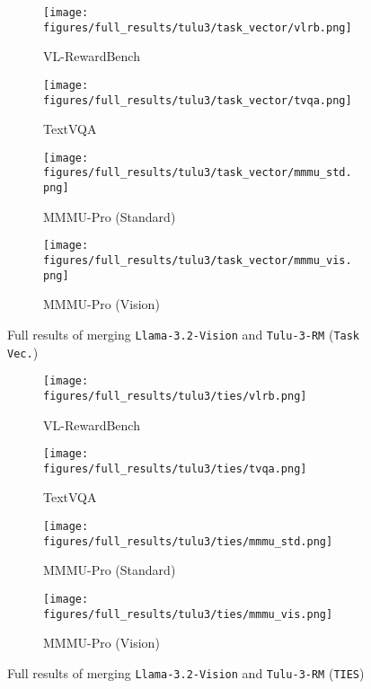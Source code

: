 \begin{figure*}[ht]
     \centering
     \begin{subfigure}[b]{0.245\linewidth}
         \centering
         \texttt{[image: figures/full\_results/tulu3/task\_vector/vlrb.png]}
         \caption{VL-RewardBench}
     \end{subfigure}
     \hfill
     \begin{subfigure}[b]{0.245\linewidth}
         \centering
         \texttt{[image: figures/full\_results/tulu3/task\_vector/tvqa.png]}
         \caption{TextVQA}
     \end{subfigure}
     \hfill
      \begin{subfigure}[b]{0.245\linewidth}
         \centering
         \texttt{[image: figures/full\_results/tulu3/task\_vector/mmmu\_std.png]}
         \caption{MMMU-Pro (Standard)}
     \end{subfigure}
     \hfill
     \begin{subfigure}[b]{0.245\linewidth}
         \centering
         \texttt{[image: figures/full\_results/tulu3/task\_vector/mmmu\_vis.png]}
         \caption{MMMU-Pro (Vision)}
     \end{subfigure}
        \caption{Full results of merging \texttt{Llama-3.2-Vision} and \texttt{Tulu-3-RM} (\texttt{Task Vec.})}
        \vspace{-10pt}
        \label{fig:full_tulu3_task_vector}
\end{figure*}

\begin{figure*}[ht]
     \centering
     \begin{subfigure}[b]{0.245\linewidth}
         \centering
         \texttt{[image: figures/full\_results/tulu3/ties/vlrb.png]}
         \caption{VL-RewardBench}
     \end{subfigure}
     \hfill
     \begin{subfigure}[b]{0.245\linewidth}
         \centering
         \texttt{[image: figures/full\_results/tulu3/ties/tvqa.png]}
         \caption{TextVQA}
     \end{subfigure}
     \hfill
      \begin{subfigure}[b]{0.245\linewidth}
         \centering
         \texttt{[image: figures/full\_results/tulu3/ties/mmmu\_std.png]}
         \caption{MMMU-Pro (Standard)}
     \end{subfigure}
     \hfill
     \begin{subfigure}[b]{0.245\linewidth}
         \centering
         \texttt{[image: figures/full\_results/tulu3/ties/mmmu\_vis.png]}
         \caption{MMMU-Pro (Vision)}
     \end{subfigure}
        \caption{Full results of merging \texttt{Llama-3.2-Vision} and \texttt{Tulu-3-RM} (\texttt{TIES})}
        \vspace{-10pt}
        \label{fig:full_tulu3_ties}
\end{figure*}


